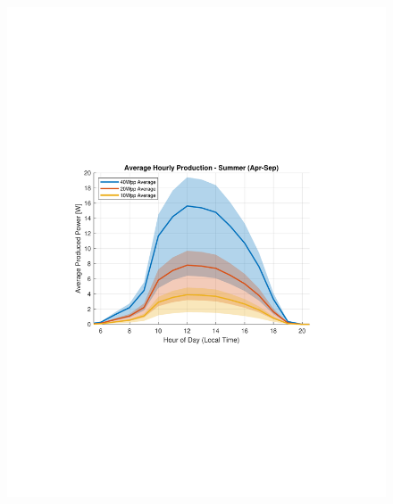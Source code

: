 \begin{figure}[H]
    \centering
    \begin{minipage}[t]{0.48\textwidth} %
        \centering
        \includegraphics[width=\linewidth]{photos/Average_production_with_eta&soiling&loss_shaded_allPanels_Summer.pdf} %
    \end{minipage}%
    \hspace{0.02\textwidth}%
    \begin{minipage}[t]{0.48\textwidth} %
        \centering

\end{minipage}
\end{figure}
